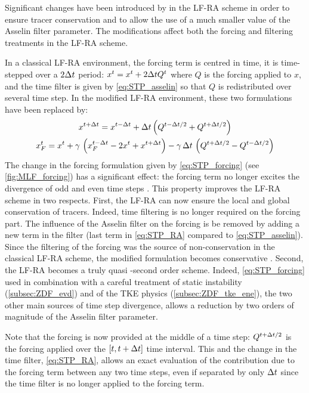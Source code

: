 \documentclass[../main/NEMO_manual]{subfiles}
\begin{document}
Significant changes have been introduced by \cite{Leclair_Madec_OM09} in the LF-RA scheme in order to
ensure tracer conservation and to allow the use of a much smaller value of the Asselin filter parameter.
The modifications affect both the forcing and filtering treatments in the LF-RA scheme.

In a classical LF-RA environment, the forcing term is centred in time,
\ie it is time-stepped over a $2 \Delta t$ period:
$x^t = x^t + 2 \Delta t Q^t$ where $Q$ is the forcing applied to $x$,
and the time filter is given by \autoref{eq:STP_asselin} so that $Q$ is redistributed over several time step.
In the modified LF-RA environment, these two formulations have been replaced by:
\begin{gather}
  \label{eq:STP_forcing}
  x^{t + \Delta t} = x^{t - \Delta t} + \Delta t \left( Q^{t - \Delta t / 2} + Q^{t + \Delta t / 2} \right)  \\
  \label{eq:STP_RA}
  x_F^t       = x^t + \gamma \, \left( x_F^{t - \Delta t} - 2 x^t + x^{t + \Delta t} \right)
                    - \gamma \, \Delta t \, \left( Q^{t + \Delta t / 2} - Q^{t - \Delta t / 2} \right)
\end{gather}
The change in the forcing formulation given by \autoref{eq:STP_forcing} (see \autoref{fig:MLF_forcing})
has a significant effect:
the forcing term no longer excites the divergence of odd and even time steps \citep{Leclair_Madec_OM09}.
This property improves the LF-RA scheme in two respects.
First, the LF-RA can now ensure the local and global conservation of tracers.
Indeed, time filtering is no longer required on the forcing part.
The influence of the Asselin filter on the forcing is be removed by adding a new term in the filter
(last term in \autoref{eq:STP_RA} compared to \autoref{eq:STP_asselin}).
Since the filtering of the forcing was the source of non-conservation in the classical LF-RA scheme,
the modified formulation becomes conservative \citep{Leclair_Madec_OM09}.
Second, the LF-RA becomes a truly quasi -second order scheme.
Indeed, \autoref{eq:STP_forcing} used in combination with a careful treatment of static instability
(\autoref{subsec:ZDF_evd}) and of the TKE physics (\autoref{subsec:ZDF_tke_ene}),
the two other main sources of time step divergence,
allows a reduction by two orders of magnitude of the Asselin filter parameter.

Note that the forcing is now provided at the middle of a time step:
$Q^{t + \Delta t / 2}$ is the forcing applied over the $[t,t + \Delta t]$ time interval.
This and the change in the time filter, \autoref{eq:STP_RA},
allows an exact evaluation of the contribution due to the forcing term between any two time steps,
even if separated by only $\Delta t$ since the time filter is no longer applied to the forcing term.
\end{document}
